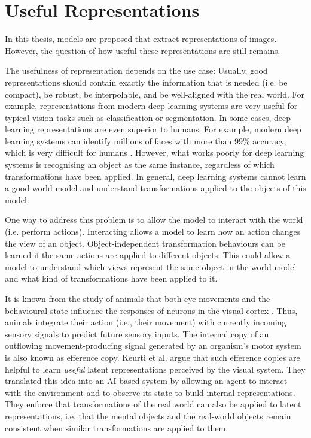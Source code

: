 \section{Useful Representations}
In this thesis, models are proposed that extract representations of images.
However, the question of how useful these representations are still remains.

The usefulness of representation depends on the use case: Usually, good representations should contain exactly the information that is needed (i.e. be compact), be robust, be interpolable, and be well-aligned with the real world.
For example, representations from modern deep learning systems are very useful for typical vision tasks such as classification or segmentation. In some cases, deep learning representations are even superior to humans. For example, modern deep learning systems  can identify millions of faces with more than $99\%$ accuracy, which is very difficult for humans . 
However, what works poorly for deep learning systems is recognising an object as the same instance, regardless of which transformations have been applied. In general, deep learning systems cannot learn a good world model and understand transformations applied to the objects of this model.

One way to address this problem is to allow the model to interact with the world (i.e. perform actions). Interacting allows a model to learn how an action changes the view of an object. Object-independent transformation behaviours can be learned if the same actions are applied to different objects. This could allow a model to understand which views represent the same object in the world model and what kind of transformations have been applied to it.

It is known from the study of animals that both eye movements and the behavioural state influence the responses of neurons in the visual cortex .
Thus, animals integrate their action (i.e., their movement) with currently incoming sensory signals to predict future sensory inputs.
The internal copy of an outflowing movement-producing signal generated by an organism's motor system is also known as efference copy.
Keurti et al.  argue that such efference copies are helpful to learn \emph{useful} latent representations perceived by the visual system.
They translated this idea into an AI-based system by allowing an agent to interact with the environment and to observe its state to build internal representations.
They enforce that transformations of the real world can also be applied to latent representations, i.e. that the mental objects and the real-world objects remain consistent when similar transformations are applied to them.

